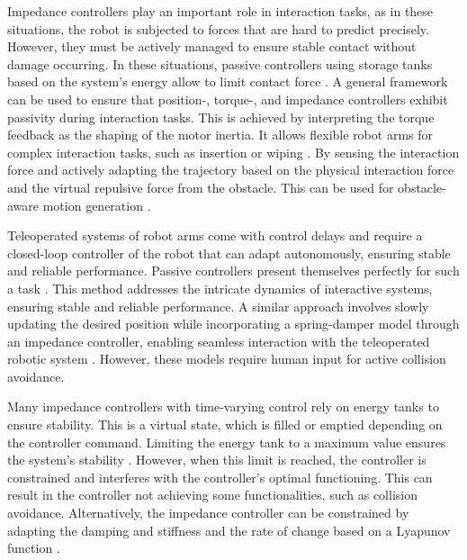 \iflong
Impedance controllers play an important role in interaction tasks, as in these situations, the robot is subjected to forces that are hard to predict precisely. However, they must be actively managed to ensure stable contact without damage occurring. In these situations, passive controllers using storage tanks based on the system's energy allow to limit contact force \parencite{kishi2003passive}.
A general framework can be used to ensure that position-, torque-, and impedance controllers exhibit passivity during interaction tasks. This is achieved by interpreting the torque feedback as the shaping of the motor inertia. It allows flexible robot arms for complex interaction tasks, such as insertion or wiping \parencite{albu2007unified}. 
By sensing the interaction force and actively adapting the trajectory based on the physical interaction force and the virtual repulsive force from the obstacle. This can be used for obstacle-aware motion generation \parencite{haddadin2010real}.
\fi

\iflong
Teleoperated systems of robot arms come with control delays and require a closed-loop controller of the robot that can adapt autonomously, ensuring stable and reliable performance. Passive controllers present themselves perfectly for such a task  \parencite{stramigioli2005sampled}. This method addresses the intricate dynamics of interactive systems, ensuring stable and reliable performance.
A similar approach involves slowly updating the desired position while incorporating a spring-damper model through an impedance controller, enabling seamless interaction with the teleoperated robotic system \parencite{lee2010passive}.
However, these models require human input for active collision avoidance.
\fi

Many impedance controllers with time-varying control rely on energy tanks to ensure stability. This is a virtual state, which is filled or emptied depending on the controller command. Limiting the energy tank to a maximum value ensures the system's stability  \parencite{ferraguti2013tank}. However, when this limit is reached, the controller is constrained and interferes with the controller's optimal functioning. This can result in the controller not achieving some functionalities, such as collision avoidance.
Alternatively, the impedance controller can be constrained by adapting the damping and stiffness and the rate of change based on a Lyapunov function \cite{kronander2016stability}.

